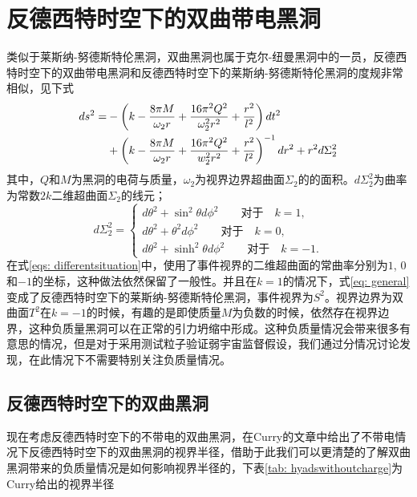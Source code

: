 \section{反德西特时空下的双曲带电黑洞}
类似于莱斯纳-努德斯特伦黑洞，双曲黑洞也属于克尔-纽曼黑洞中的一员，反德西特时空下的双曲带电黑洞和反德西特时空下的莱斯纳-努德斯特伦黑洞的度规非常相似，见下式
\begin{align}\label{eq: general}
    ds^2=&-\left(k-\frac{8\pi M}{\omega_2 r}+\frac{16 \pi^2 Q^2}{\omega_2^2r^2}+\frac{r^2}{l^2}\right)dt^2 \notag \\
    &+\left(k-\frac{8\pi M}{\omega_2 r}+\frac{16\pi^2 Q^2}{w_2^2 r^2}+\frac{r^2}{l^2}\right)^{-1}dr^2+r^2d\Sigma_2^2
\end{align}
其中，$Q$和$M$为黑洞的电荷与质量，$\omega_2$为视界边界超曲面$\Sigma_2$的的面积。$d\Sigma_2^2$为曲率为常数$2k$二维超曲面$\Sigma_2$的线元；
\begin{equation}\label{eqs: differentsituation}
    d\Sigma^2_2=\begin{cases}
        d\theta^2+\sin ^2 \theta d\phi^2 \qquad \text{对于} \quad k=1, \\
        d\theta^2+ \theta^2 d\phi^2 \qquad \text{对于} \quad k=0, \\
        d\theta^2+\sinh ^2 \theta d\phi^2 \qquad \text{对于} \quad k=-1.
    \end{cases}
\end{equation}
在式\eqref{eqs: differentsituation}中，使用了事件视界的二维超曲面的常曲率分别为$1$, $0$和$-1$的坐标，这种做法依然保留了一般性。并且在$k=1$的情况下，式\eqref{eq: general}变成了反德西特时空下的莱斯纳-努德斯特伦黑洞，事件视界为$S^2$。视界边界为双曲面$T^2$在$k=-1$的时候，有趣的是即使质量$M$为负数的时候，依然存在视界边界，这种负质量黑洞可以在正常的引力坍缩中形成\citep{mann1997black,smith1997formation}。这种负质量情况会带来很多有意思的情况，但是对于采用测试粒子验证弱宇宙监督假设，我们通过分情况讨论发现，在此情况下不需要特别关注负质量情况。

\subsection{反德西特时空下的双曲黑洞}
现在考虑反德西特时空下的不带电的双曲黑洞，在Curry的文章中\citep{curry1991vacuum}给出了不带电情况下反德西特时空下的双曲黑洞的视界半径，借助于此我们可以更清楚的了解双曲黑洞带来的负质量情况是如何影响视界半径的，下表\ref{tab: hyadswithoutcharge}为Curry给出的视界半径

